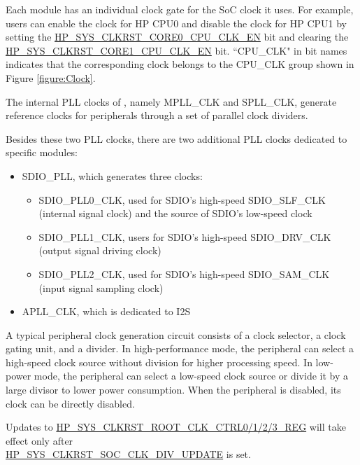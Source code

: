 \documentclass[main\_\_EN.tex]{subfiles}
\begin{document}
Each module has an individual clock gate for the SoC clock it uses. For example, users can enable the clock for HP CPU0 and disable the clock for HP CPU1 by setting the \hyperref[fielddesc:HPSYSCLKRSTCORE0CPUCLKEN]{HP\_SYS\_CLKRST\_CORE0\_CPU\_CLK\_EN} bit and clearing the \hyperref[fielddesc:HPSYSCLKRSTCORE1CPUCLKEN]{HP\_SYS\_CLKRST\_CORE1\_CPU\_CLK\_EN} bit. ``CPU\_CLK" in bit names indicates that the corresponding clock belongs to the CPU\_CLK group shown in Figure \ref{figure:Clock}.

The internal PLL clocks of \chipname{}, namely MPLL\_CLK and SPLL\_CLK, generate reference clocks for peripherals through a set of parallel clock dividers.

Besides these two PLL clocks, there are two additional PLL clocks dedicated to specific modules:

\begin{itemize}
    \item SDIO\_PLL, which generates three clocks:
        \begin{itemize}
            \item SDIO\_PLL0\_CLK, used for SDIO's high-speed SDIO\_SLF\_CLK (internal signal clock) and the source of SDIO's low-speed clock
            \item SDIO\_PLL1\_CLK, users for SDIO's high-speed SDIO\_DRV\_CLK (output signal driving clock)
            \item SDIO\_PLL2\_CLK, used for SDIO's high-speed SDIO\_SAM\_CLK (input signal sampling clock)
        \end{itemize}
    \item APLL\_CLK, which is dedicated to I2S
\end{itemize}

A typical peripheral clock generation circuit consists of a clock selector, a clock gating unit, and a divider. In high-performance mode, the peripheral can select a high-speed clock source without division for higher processing speed. In low-power mode, the peripheral can select a low-speed clock source or divide it by a large divisor to lower power consumption. When the peripheral is disabled, its clock can be directly disabled.


\begin{tiplisting}
Updates to \hyperref[regdesc:HPSYSCLKRSTROOTCLKCTRL0REG]{HP\_SYS\_CLKRST\_ROOT\_CLK\_CTRL0/1/2/3\_REG} will take effect only after \\\hyperref[fielddesc:HPSYSCLKRSTSOCCLKDIVUPDATE]{HP\_SYS\_CLKRST\_SOC\_CLK\_DIV\_UPDATE} is set.
\end{tiplisting}
\end{document}
